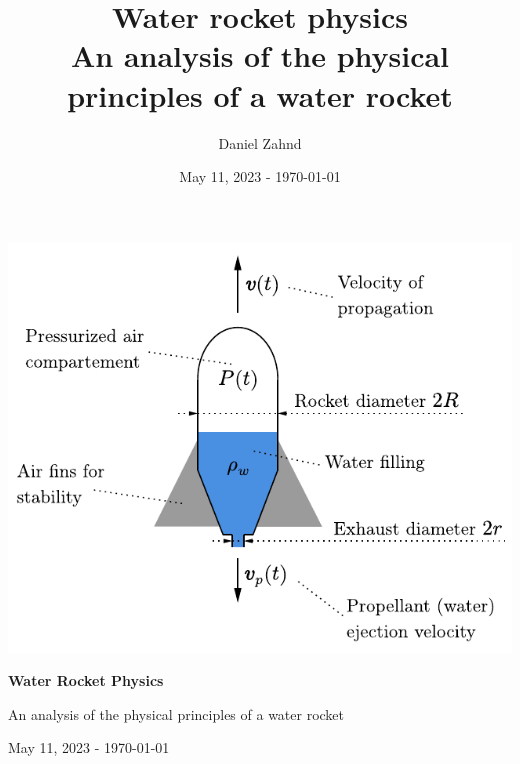\documentclass[a4paper,11pt]{report}
\author{Daniel Zahnd}
\date{May 11, 2023 - \today}
\title{Water rocket physics \\ \vspace{0.5cm} \normalsize An analysis of the physical principles of a water rocket}
\begin{document}
\begin{titlepage}
    
    \centering
    
    \includegraphics[width=\textwidth-3cm]{figures/setupcalculations.pdf} %
    
    \vspace{2cm}
    
    \Huge
    \textbf{Water Rocket Physics}
    
    \vspace{0.5cm}
    
    \normalsize
    An analysis of the physical principles of a water rocket
    
    \vspace{3cm}
    
    \Large
    
    \vfill
    
    \large
    May 11, 2023 - \today %
    
\end{titlepage}

\end{document}
